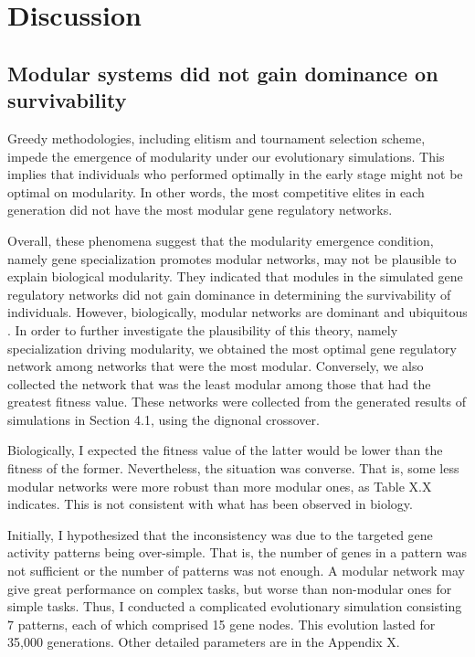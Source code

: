 \section{Discussion}
\subsection{Modular systems did not gain dominance on survivability}
Greedy methodologies, including elitism and tournament selection scheme, impede the emergence of modularity under our evolutionary simulations. This implies that individuals who performed optimally in the early stage might not be optimal on modularity. In other words, the most competitive elites in each generation did not have the most modular gene regulatory networks. 

Overall, these phenomena suggest that the modularity emergence condition, namely gene specialization promotes modular networks, may not be plausible to explain biological modularity. They indicated that modules in the simulated gene regulatory networks did not gain dominance in determining the survivability of individuals. However, biologically, modular networks are dominant and ubiquitous \cite{schlosser2004modularity}. In order to further investigate the plausibility of this theory, namely specialization driving modularity, we obtained the most optimal gene regulatory network among networks that were the most modular. Conversely, we also collected the network that was the least modular among those that had the greatest fitness value. These networks were collected from the generated results of simulations in Section 4.1, using the dignonal crossover.

Biologically, I expected the fitness value of the latter would be lower than the fitness of the former. Nevertheless, the situation was converse. That is, some less modular networks were more robust than more modular ones, as Table X.X indicates. This is not consistent with what has been observed in biology.

Initially, I hypothesized that the inconsistency was due to the targeted gene activity patterns being over-simple. That is, the number of genes in a pattern was not sufficient or the number of patterns was not enough. A modular network may give great performance on complex tasks, but worse than non-modular ones for simple tasks. Thus, I conducted a complicated evolutionary simulation consisting $7$ patterns, each of which comprised 15 gene nodes. This evolution lasted for 35,000 generations. Other detailed parameters are in the Appendix X.

